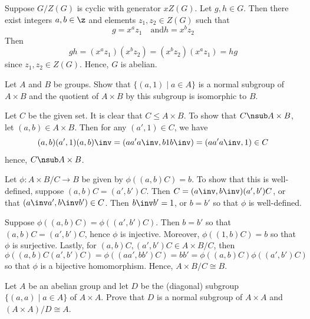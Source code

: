 \begin{sol}
    Suppose $G/Z(G)$ is cyclic with generator $xZ(G)$. Let $g, h \in G$. Then there exist integers $a, b \in \z$ and elements $z_1, z_2 \in Z(G)$ such that
    \[g = x^a z_1 \quad \text{and} h = x^b z_2\]
    Then
    \[gh = (x^a z_1)(x^b z_2) = (x^b z_2)(x^a z_1) = hg\]
    since $z_1, z_2 \in Z(G)$. Hence, $G$ is abelian.
\end{sol}

\begin{exercise}\label{ex3.1.37}
    Let $A$ and $B$ be groups. Show that $\{(a,1) \mid a \in A\}$ is a normal subgroup of $A \times B$ and the quotient of $A \times B$ by this subgroup is isomorphic to $B$.
\end{exercise}

\begin{sol}
    Let $C$ be the given set. It is clear that $C \leq A \times B$. To show that $C \nsub A \times B$, let $(a, b) \in A \times B$. Then for any $(a', 1) \in C$, we have
    \[(a, b)(a', 1)(a, b)\inv = (aa'a\inv, b1b\inv) = (aa'a\inv, 1) \in C\]
    hence, $C \nsub A \times B$.

    Let $\phi : A \times B/C \to B$ be given by $\phi((a, b)C) = b$. To show that this is well-defined, suppose $(a, b)C = (a', b')C$. Then $C = (a\inv, b\inv)(a', b')C$, or that $(a\inv a', b\inv b') \in C$. Then $b\inv b' = 1$, or $b = b'$ so that $\phi$ is well-defined.

    Suppose $\phi((a, b)C) = \phi((a', b')C)$. Then $b = b'$ so that $(a, b)C = (a', b')C$, hence $\phi$ is injective. Moreover, $\phi((1, b)C) = b$ so that $\phi$ is surjective. Lastly, for $(a, b)C, (a', b')C \in A \times B/C$, then
    \[\phi((a, b)C (a', b')C) = \phi((aa', bb')C) = bb' = \phi((a, b)C)\phi((a', b')C)\]
    so that $\phi$ is a bijective homomorphism. Hence, $A \times B/C \cong B$.
\end{sol}

\begin{exercise}\label{ex3.1.38}
    Let $A$ be an abelian group and let $D$ be the (diagonal) subgroup $\{(a,a) \mid a \in A\}$ of $A \times A$. Prove that $D$ is a normal subgroup of $A \times A$ and $(A \times A)/D \cong A$.
\end{exercise}

